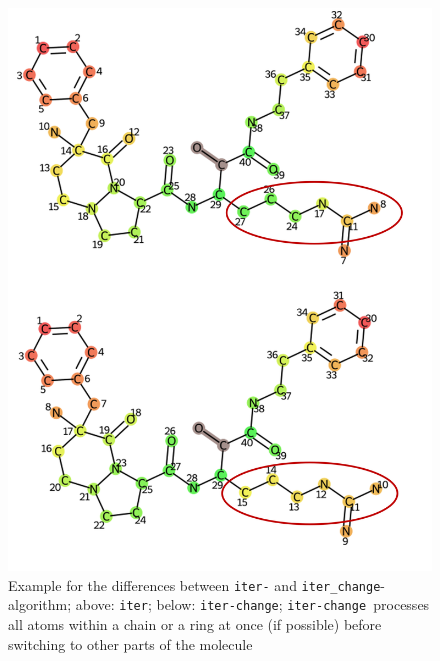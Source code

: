 \begin{figure}
\includegraphics[scale=0.25]{iter_iter_change_1a5g_1_two_rows}

\caption{Example for the differences between \texttt{iter-} and \texttt{iter\_change}-algorithm;
above: \texttt{iter}; below: \texttt{iter-change}; \texttt{iter-change }processes all atoms within
a chain or a ring at once (if possible) before switching to other
parts of the molecule}
\label{fig:iter_iter_change_comparison}
\end{figure}

